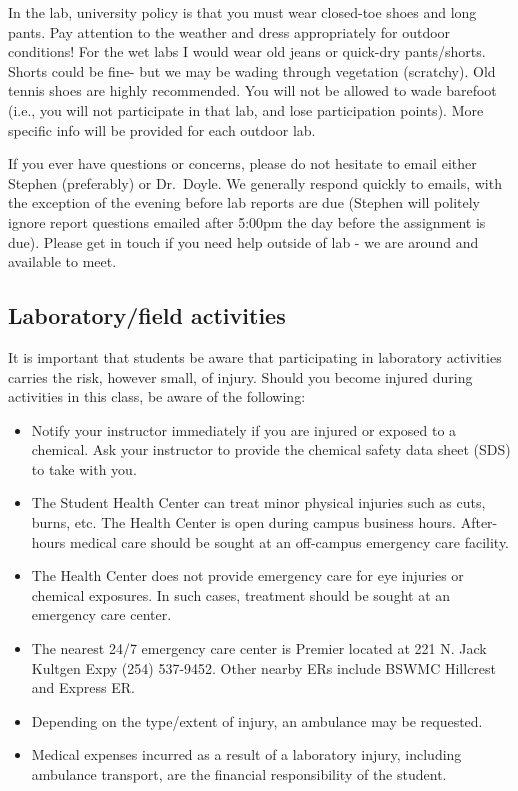 \documentclass[11pt,]{article}
\providecommand{\tightlist}{%
  \setlength{\itemsep}{0pt}\setlength{\parskip}{0pt}}
\begin{document}
In the lab, university policy is that you must wear closed-toe shoes and
long pants. Pay attention to the weather and dress appropriately for
outdoor conditions! For the wet labs I would wear old jeans or quick-dry
pants/shorts. Shorts could be fine- but we may be wading through
vegetation (scratchy). Old tennis shoes are highly recommended. You will
not be allowed to wade barefoot (i.e., you will not participate in that
lab, and lose participation points). More specific info will be provided
for each outdoor lab.

If you ever have questions or concerns, please do not hesitate to email
either Stephen (preferably) or Dr.~Doyle. We generally respond quickly
to emails, with the exception of the evening before lab reports are due
(Stephen will politely ignore report questions emailed after 5:00pm the
day before the assignment is due). Please get in touch if you need help
outside of lab - we are around and available to meet.

\hypertarget{laboratoryfield-activities}{%
\subsection{Laboratory/field
activities}\label{laboratoryfield-activities}}

It is important that students be aware that participating in laboratory
activities carries the risk, however small, of injury. Should you become
injured during activities in this class, be aware of the following:

\begin{itemize}
\tightlist
\item
  Notify your instructor immediately if you are injured or exposed to a
  chemical. Ask your instructor to provide the chemical safety data
  sheet (SDS) to take with you.
\item
  The Student Health Center can treat minor physical injuries such as
  cuts, burns, etc. The Health Center is open during campus business
  hours. After-hours medical care should be sought at an off-campus
  emergency care facility.
\item
  The Health Center does not provide emergency care for eye injuries or
  chemical exposures. In such cases, treatment should be sought at an
  emergency care center.
\item
  The nearest 24/7 emergency care center is Premier located at 221 N.
  Jack Kultgen Expy (254) 537-9452. Other nearby ERs include BSWMC
  Hillcrest and Express ER.
\item
  Depending on the type/extent of injury, an ambulance may be requested.
\item
  Medical expenses incurred as a result of a laboratory injury,
  including ambulance transport, are the financial responsibility of the
  student.
\end{itemize}
\end{document}
